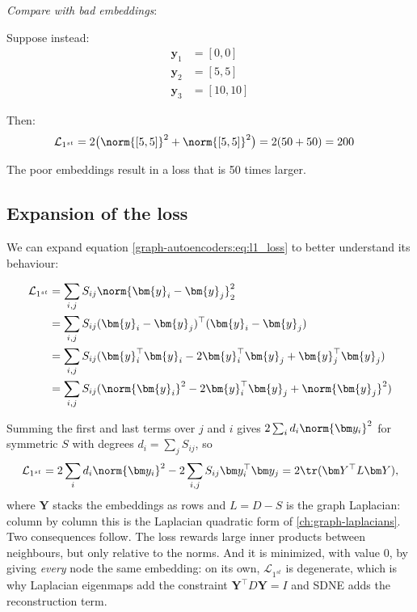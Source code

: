 \begin{notechapter}
\begin{example}
\emph{Compare with bad embeddings}:

Suppose instead:
\begin{align*}
\bm{y}_1 &= [0, 0] \\
\bm{y}_2 &= [5, 5] \\
\bm{y}_3 &= [10, 10]
\end{align*}

Then:
\begin{align*}
\mathcal{L}_{1^{st}} &= 2\bigl(\norm{[5,5]}^2 + \norm{[5,5]}^2\bigr) = 2(50 + 50) = 200
\end{align*}

The poor embeddings result in a loss that is 50 times larger.
\end{example}

\subsection{Expansion of the loss}

We can expand equation \eqref{graph-autoencoders:eq:l1_loss} to better understand its behaviour:

\begin{align}
\mathcal{L}_{1^{st}} &= \sum_{i,j} S_{ij} \norm{\bm{y}_i - \bm{y}_j}^2_2 \nonumber \\
&= \sum_{i,j} S_{ij} (\bm{y}_i - \bm{y}_j)^\top(\bm{y}_i - \bm{y}_j) \nonumber \\
&= \sum_{i,j} S_{ij} (\bm{y}_i^\top\bm{y}_i - 2\bm{y}_i^\top\bm{y}_j + \bm{y}_j^\top\bm{y}_j) \nonumber \\
&= \sum_{i,j} S_{ij} (\norm{\bm{y}_i}^2 - 2\bm{y}_i^\top\bm{y}_j + \norm{\bm{y}_j}^2)
\label{graph-autoencoders:eq:l1_expanded}
\end{align}

Summing the first and last terms over $j$ and $i$ gives $2\sum_id_i\norm{\bm y_i}^2$ for symmetric $S$ with degrees $d_i = \sum_jS_{ij}$, so
\begin{equation}
\mathcal{L}_{1^{st}} = 2\sum_id_i\norm{\bm y_i}^2 - 2\sum_{i,j}S_{ij}\bm y_i^\top\bm y_j = 2\tr(\bm Y^\top L\bm Y),
\label{graph-autoencoders:eq:l1_trace}
\end{equation}
where $\bm Y$ stacks the embeddings as rows and $L = D - S$ is the graph Laplacian: column by column this is the Laplacian quadratic form of \cref{ch:graph-laplacians}. Two consequences follow. The loss rewards large inner products between neighbours, but only relative to the norms. And it is minimized, with value $0$, by giving \emph{every} node the same embedding: on its own, $\mathcal L_{1^{st}}$ is degenerate, which is why Laplacian eigenmaps add the constraint $\bm Y^\top D\bm Y = I$ and SDNE adds the reconstruction term.


\end{notechapter}
